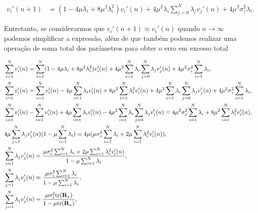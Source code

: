 \documentclass[a4paper,10pt]{article}
\begin{document}
\begin{enumerate}
\begin{enumerate}
						\begin{align}
							v_{i}'(n + 1) &= (1 - 4 \mu \lambda_{i} + 8 \mu^{2} \lambda^{2}_{i}) v_{i}'(n) + 4 \mu^{2} \lambda_{i} \sum^{N}_{j = 0} \lambda_{j} v_{j}'(n) + 4 \mu^{2} \sigma^{2}_{z} \lambda_{i}.
						\end{align}

						Entretanto, se considerarmos que $v_{i}'(n + 1) \approx v_{i}'(n)$ quando $n \rightarrow \infty$ podemos simplificar a expressão, além de que 
						também podemos realizar uma operação de soma total dos parâmetros para obter o erro em excesso total

						\begin{align}
							\notag &\sum^{N}_{i = 1} v_{i}'(n) = \sum^{N}_{i = 1} (1 - 4 \mu \lambda_{i} + 8 \mu^{2} \lambda^{2}_{i}) v_{i}'(n) + 4 \mu^{2} \sum^{N}_{i = 1} \lambda_{i} \sum^{N}_{j = 0} \lambda_{j} v_{j}'(n) + 4 \mu^{2} \sigma^{2}_{z} \sum^{N}_{i = 1} \lambda_{i}, \\
							\notag &\sum^{N}_{i = 1} v_{i}'(n) = \sum^{N}_{i = 1} v_{i}'(n) - 4 \mu \sum^{N}_{i = 1} \lambda_{i} v_{i}'(n)  + 8 \mu^{2} \sum^{N}_{i = 1} \lambda^{2}_{i} v_{i}'(n) + 4 \mu^{2} \sum^{N}_{i = 1} \lambda_{i} \sum^{N}_{j = 0} \lambda_{j} v_{j}'(n) + 4 \mu^{2} \sigma^{2}_{z} \sum^{N}_{i = 1} \lambda_{i}, \\
							\notag &\sum^{N}_{i = 1} v_{i}'(n) - \sum^{N}_{i = 1} v_{i}'(n) + 4 \mu \sum^{N}_{i = 1} \lambda_{i} v_{i}'(n) - 4 \mu^{2} \sum^{N}_{i = 1} \lambda_{i} \sum^{N}_{j = 0} \lambda_{j} v_{j}'(n) = 4 \mu^{2} \sigma^{2}_{z} \sum^{N}_{i = 1} \lambda_{i} + 8 \mu^{2} \sum^{N}_{i = 1} \lambda^{2}_{i} v_{i}'(n), \\
							\notag &4 \mu \sum^{N}_{j = 1} \lambda_{j} v_{j}'(n)(1 - \mu \sum^{N}_{i = 1} \lambda_{i}) = 4 \mu (\mu \sigma^{2}_{z} \sum^{N}_{i = 1} \lambda_{i} + 2 \mu \sum^{N}_{i = 1} \lambda^{2}_{i} v_{i}'(n)), \\
							\notag &\sum^{N}_{j = 1} \lambda_{j} v_{j}'(n) = \frac{\mu \sigma^{2}_{z} \sum^{N}_{i = 1} \lambda_{i} + 2 \mu \sum^{N}_{i = 1} \lambda^{2}_{i} v_{i}'(n)}{1 - \mu \sum^{N}_{i = 1} \lambda_{i}}, \\
							\notag &\sum^{N}_{j = 1} \lambda_{j} v_{j}'(n) \approx \frac{\mu \sigma^{2}_{z} \sum^{N}_{i = 1} \lambda_{i} }{1 - \mu \sum^{N}_{i = 1} \lambda_{i}}, \\
							&\sum^{N}_{j = 1} \lambda_{j} v_{j}'(n) = \frac{\mu \sigma^{2}_{z} \text{tr}(\mathbf{R}_{x})}{1 - \mu \text{tr}(\mathbf{R}_{x})},
						\end{align}


\end{enumerate}
\end{enumerate}
\end{document}
